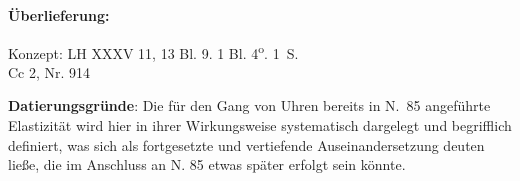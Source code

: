       
               
                \begin{ledgroupsized}[r]{120mm}
                \footnotesize 
                \pstart                
                \noindent\textbf{\"{U}berlieferung:}   
                \pend
                \end{ledgroupsized}
            
              
                            \begin{ledgroupsized}[r]{114mm}
                            \footnotesize 
                            \pstart \parindent -6mm
                           Konzept:
LH XXXV 11, 13 Bl. 9. 1 Bl. 4\textsuperscript{o}. 1\, S.
\\Cc 2, Nr. 914 \pend
                            \end{ledgroupsized}
                \vspace*{5mm}
                \begin{ledgroup}
                \footnotesize 
                \pstart
            \noindent\footnotesize{\textbf{Datierungsgr\"{u}nde}: Die für den Gang von Uhren bereits in N.~85 angeführte Elastizität wird hier in ihrer Wirkungsweise systematisch dargelegt und begrifflich definiert, was sich als fortgesetzte und vertiefende Auseinandersetzung deuten ließe, die im Anschluss an N. 85 etwas später erfolgt sein könnte.}
                \pend
                \end{ledgroup}
            
